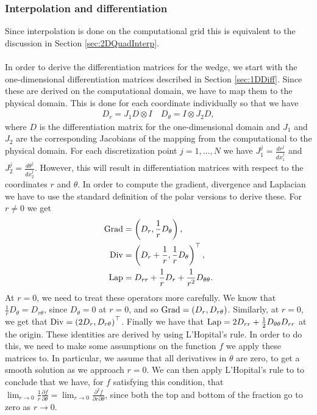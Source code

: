 \subsubsection{Interpolation and differentiation}
Since interpolation is done on the computational grid this is equivalent to the discussion in Section \ref{sec:2DQuadInterp}.
\\
\\
In order to derive the differentiation matrices for the wedge, we start with the one-dimensional differentiation matrices described in Section \ref{sec:1DDiff}. Since these are derived on the computational domain, we have to map them to the physical domain. This is done for each coordinate individually so that we have
\begin{align*}
	D_r = J_1D \otimes I \quad 	D_\theta =I \otimes J_2D,
\end{align*} 
where $D$ is the differentiation matrix for the one-dimensional domain and $J_1$ and $J_2$  are the corresponding Jacobians of the mapping from the computational to the physical domain. For each discretization point $j = 1,...,N$ we have $ J_1^j= \frac{dr^j}{dx_1^j}$ and $J_2^j = \frac{d\theta^j}{dx_2^j}$.
However, this will result in differentiation matrices with respect to the coordinates $r$ and $\theta$. In order to compute the gradient, divergence and Laplacian we have to use the standard definition of the polar versions to derive these. For $ r \neq 0$ we get
\begin{align*}
	\operatorname{Grad}  &= \left(D_r, \frac{1}{r} D_\theta\right) ,\\
	\operatorname{Div} &= \left(D_r + \frac{1}{r}, \frac{1}{r} D_\theta\right)^\top ,\\
	\operatorname{Lap}  &= D_{rr} +\frac{1}{r}D_r +  \frac{1}{r^2} D_{\theta \theta}.
\end{align*}
At $ r = 0$, we need to treat these operators more carefully. We know that $\frac{1}{r} D_\theta = D_{r\theta}$, since $D_\theta =0$ at $r = 0$, and so $ \operatorname{Grad} = \left(D_r, D_{r\theta}\right)$. Similarly, at $r = 0$, we get that $\operatorname{Div} = \left(2D_r, D_{r\theta}\right)^\top$. Finally we have that $\operatorname{Lap} = 2 D_{rr} + \frac{1}{2} D_{\theta\theta}D_{rr}$ at the origin.
These identities are derived by using L'Hopital's rule. In order to do this, we need to make some assumptions on the function $f$ we apply these matrices to. In particular, we assume that all derivatives in $\theta$ are zero, to get a smooth solution as we approach $r =0$. We can then apply L'Hopital's rule to to conclude that we have, for $f$ satisfying this condition, that $\displaystyle \lim_{r \to 0}\frac{1}{r} \frac{\partial f}{\partial \theta} = \lim_{r \to 0} \frac{\partial^2 f}{\partial r \partial \theta}$, since both the top and bottom of the fraction go to zero as $r \to 0$.

